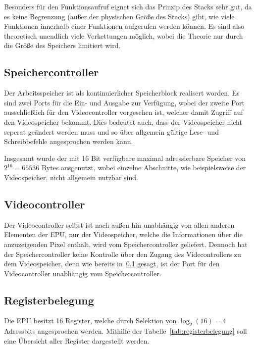 Besonders für den Funktionsaufruf eignet sich das Prinzip des Stacks sehr gut,
da es keine Begrenzung (außer der physischen Größe des Stacks) gibt, wie viele
Funktionen innerhalb einer Funktionen aufgerufen werden können. Es sind also
theoretisch unendlich viele Verkettungen möglich, wobei die Theorie nur durch
die Größe des Speichers limitiert wird.
\subsection{Speichercontroller}
\label{s:memorycontrol}
Der Arbeitsspeicher ist als kontinuierlicher Speicherblock realisert worden. Es
sind zwei Ports für die Ein- und Ausgabe zur Verfügung, wobei der zweite Port
ausschließlich für den Videocontroller vorgesehen ist, welcher damit Zugriff auf
den Videospeicher bekommt. Dies bedeutet auch, dass der Videospeicher nicht
seperat geändert werden muss und so über allgemein gültige Lese- und
Schreibbefehle angesprochen werden kann.

Insgesamt wurde der mit 16 Bit verfügbare maximal adressierbare Speicher von
$2^{16} = 65536$ Bytes ausgenutzt, wobei einzelne Abschnitte, wie beispielsweise
der Videospeicher, nicht allgemein nutzbar sind.
\subsection{Videocontroller}
\label{s:videocontrol}
Der Videocontroller selbst ist nach außen hin unabhängig von allen anderen
Elementen der \ac{EPU}, nur der Videospeicher, welche die Informationen über die
anzuzeigenden Pixel enthält, wird vom Speichercontroller geliefert. Dennoch hat
der Speichercontroller keine Kontrolle über den Zugang des Videcontrollers zu
dem Videospeicher, denn wie bereits in~\ref{s:memorycontrol} gesagt, ist der
Port für den Videocontroller unabhängig vom Speichercontroller.
\pagebreak
\subsection{Registerbelegung}
Die \ac{EPU} besitzt 16 Register, welche durch Selektion von $\log_2(16) = 4$
Adressbits angesprochen werden. Mithilfe der Tabelle~\ref{tab:registerbelegung}
soll eine Übersicht aller Register dargestellt werden.

